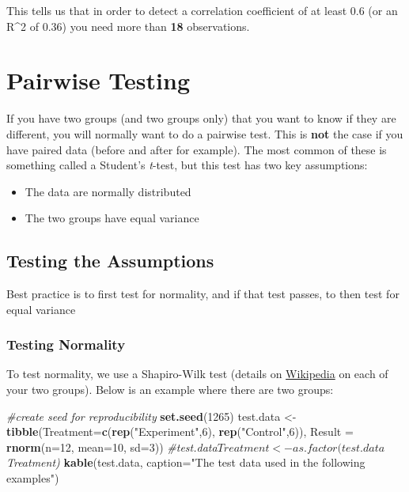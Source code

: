 \documentclass[]{article}
\newenvironment{Shaded}{\begin{snugshade}}{\end{snugshade}}
\newcommand{\KeywordTok}[1]{\textcolor[rgb]{0.13,0.29,0.53}{\textbf{{#1}}}}
\newcommand{\DataTypeTok}[1]{\textcolor[rgb]{0.13,0.29,0.53}{{#1}}}
\newcommand{\DecValTok}[1]{\textcolor[rgb]{0.00,0.00,0.81}{{#1}}}
\newcommand{\StringTok}[1]{\textcolor[rgb]{0.31,0.60,0.02}{{#1}}}
\newcommand{\CommentTok}[1]{\textcolor[rgb]{0.56,0.35,0.01}{\textit{{#1}}}}
\newcommand{\NormalTok}[1]{{#1}}
\providecommand{\tightlist}{%
  \setlength{\itemsep}{0pt}\setlength{\parskip}{0pt}}
\begin{document}
This tells us that in order to detect a correlation coefficient of at
least 0.6 (or an R\^{}2 of 0.36) you need more than \textbf{18}
observations.

\section{Pairwise Testing}\label{pairwise-testing}

If you have two groups (and two groups only) that you want to know if
they are different, you will normally want to do a pairwise test. This
is \textbf{not} the case if you have paired data (before and after for
example). The most common of these is something called a Student's
\emph{t}-test, but this test has two key assumptions:

\begin{itemize}
\tightlist
\item
  The data are normally distributed
\item
  The two groups have equal variance
\end{itemize}

\subsection{Testing the Assumptions}\label{testing-the-assumptions}

Best practice is to first test for normality, and if that test passes,
to then test for equal variance

\subsubsection{Testing Normality}\label{testing-normality}

To test normality, we use a Shapiro-Wilk test (details on
\href{https://en.wikipedia.org/wiki/Shapiro\%E2\%80\%93Wilk_test}{Wikipedia}
on each of your two groups). Below is an example where there are two
groups:

\begin{Shaded}
\begin{Highlighting}[]
\CommentTok{#create seed for reproducibility}
\KeywordTok{set.seed}\NormalTok{(}\DecValTok{1265}\NormalTok{)}
\NormalTok{test.data <-}\StringTok{ }\KeywordTok{tibble}\NormalTok{(}\DataTypeTok{Treatment=}\KeywordTok{c}\NormalTok{(}\KeywordTok{rep}\NormalTok{(}\StringTok{"Experiment"}\NormalTok{,}\DecValTok{6}\NormalTok{), }\KeywordTok{rep}\NormalTok{(}\StringTok{"Control"}\NormalTok{,}\DecValTok{6}\NormalTok{)),}
           \DataTypeTok{Result =} \KeywordTok{rnorm}\NormalTok{(}\DataTypeTok{n=}\DecValTok{12}\NormalTok{, }\DataTypeTok{mean=}\DecValTok{10}\NormalTok{, }\DataTypeTok{sd=}\DecValTok{3}\NormalTok{))}
\CommentTok{#test.data$Treatment <- as.factor(test.data$Treatment)}
\KeywordTok{kable}\NormalTok{(test.data, }\DataTypeTok{caption=}\StringTok{"The test data used in the following examples"}\NormalTok{)}
\end{Highlighting}
\end{Shaded}
\end{document}

